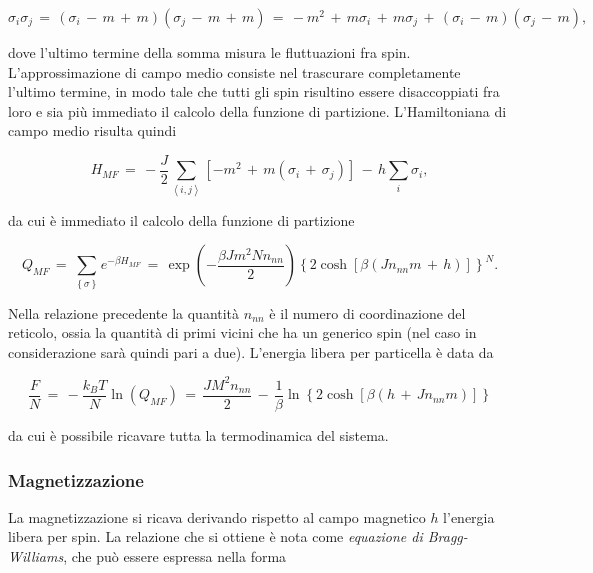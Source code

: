 \begin{equation}
    \sigma_i \sigma_j\,=\,\left(\sigma_i\,-\,m\,+\,m\right)\left(\sigma_j\,-\,m\,+\,m\right)\,=\,-m^2\,+\,m\sigma_i\,+\,m\sigma_j\,+\,\left(\sigma_i\,-\,m\right)\left(\sigma_j\,-\,m\right),
    \label{eq: int_mf}
\end{equation}

dove l'ultimo termine della somma misura le fluttuazioni fra spin. L'approssimazione di campo medio consiste nel trascurare 
completamente l'ultimo termine, in modo tale che tutti gli spin risultino essere disaccoppiati fra loro e sia più immediato il 
calcolo della funzione di partizione. L'Hamiltoniana di campo medio risulta quindi 

\begin{equation}
    H_{MF}\,=\,-\frac{J}{2} \sum_{\left<i,j\right>} \left[-m^2\,+\,m\left(\sigma_i\,+\,\sigma_j\right)\right]\,-\,h\sum_{i}\sigma_i,
    \label{eq: ham_mf}
\end{equation}

da cui è immediato il calcolo della funzione di partizione 

\begin{equation}
    Q_{MF}\,=\,\sum_{\left\{\sigma\right\}} e^{-\beta H_{MF}}\,=\,\exp{\left(-\frac{\beta J m^2 N n_{nn}}{2}\right)} \left\{2 \cosh{\left[\beta \left(J n_{nn} m\,+\,h\right)\right]}\right\}^N.
    \label{eq: part_MF_Ising1D}
\end{equation}

Nella relazione precedente la quantità $n_{nn}$ è il numero di coordinazione del reticolo, ossia la quantità di primi vicini che ha un 
generico spin (nel caso in considerazione sarà quindi pari a due). L'energia libera per particella è data da 

\begin{equation}
    \frac{F}{N}\,=\,-\frac{k_B T}{N} \ln{\left(Q_{MF}\right)}\,=\,\frac{JM^2n_{nn}}{2}\,-\,\frac{1}{\beta}\ln{\left\{2 \cosh{\left[\beta\left(h\,+\,Jn_{nn}m\right)\right]}\right\}}
    \label{eq: freeE_MF_Ising1D}
\end{equation}

da cui è possibile ricavare tutta la termodinamica del sistema.



\subsubsection{Magnetizzazione}

La magnetizzazione si ricava derivando rispetto al campo magnetico $h$ l'energia libera per spin. La relazione che si ottiene è nota 
come \textit{equazione di Bragg-Williams}, che può essere espressa nella forma 

